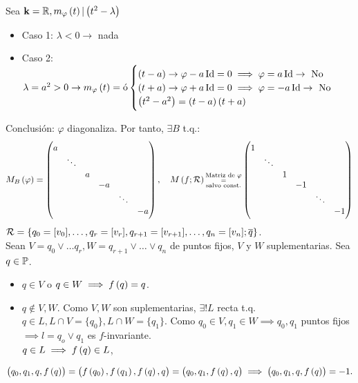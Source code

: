 \begin{obs}
	Sea $\mathbf{k} = \mathbb{R}, m_\varphi\left( t\right) | \left( t^2-\lambda\right)$
	\begin{itemize}
		\item Caso 1: $\lambda<0 \rightarrow$ nada 
		\item Caso 2: $\lambda = a^2>0 \rightarrow m_\varphi\left( t\right) = \text{ó}
		\begin{cases}
			\left( t-a\right) \rightarrow \varphi -a\operatorname{Id}=0\implies\varphi=a\operatorname{Id} \rightarrow \text{ No} \\
			\left( t+a\right) \rightarrow \varphi +a\operatorname{Id}=0\implies\varphi=-a\operatorname{Id} \rightarrow \text{ No} \\
			\left( t^2-a^2\right) = \left( t-a\right)\left( t+a\right)
		\end{cases}$
	\end{itemize}
	Conclusión: $\varphi$ diagonaliza.
	Por tanto, $\exists B$ t.q.:
	\begin{gather*}
		M_B\left(\varphi\right) =
		\begin{pmatrix}
			a & & & & & \\
			& \ddots & & & & \\
			& & a & & & \\
			& & & -a & & \\
			& & & & \ddots & \\
			& & & & & -a
		\end{pmatrix}, \quad
		M\left( f;\mathcal{R}\right) \substack{\text{Matriz de } \varphi \\=\\ \text{salvo const.}} \begin{pmatrix}
			1 & & & & & \\
			& \ddots & & & & \\
			& & 1 & & & \\
			& & & -1 & & \\
			& & & & \ddots & \\
			& & & & & -1\\
		\end{pmatrix}
	\end{gather*}
	$\mathcal{R} = \{q_0 = [v_0], \dots, q_r=[v_r], q_{r+1} = [v_{r+1}], \dots, q_n = [v_n]; \overline{q}\}$.\\
	Sean $V = q_0 \vee \dots q_r, W = q_{r+1} \vee \dots \vee q_n$ de puntos fijos, $V$ y $W$ suplementarias.
	Sea $q \in \mathbb{P}$.
	\begin{itemize}
		\item $q \in V$ o $q \in W \implies f\left( q\right)=q$.
		\item $q \notin V, W$. Como $V,W$ son suplementarias, $\exists! L$ recta t.q. $q\in L, L\cap V=\{q_0\}, L\cap W = \{q_1\}$. Como $q_0\in V, q_1 \in W \implies q_0, q_1$ puntos fijos $\implies l = q_o \vee q_1$ es $f$-invariante. \\
		$q \in L \implies f\left( q\right) \in L$,
	\end{itemize}
	\[\left( q_0, q_1, q, f\left( q\right)\right) = \left( f\left( q_0\right), f\left( q_1\right), f\left( q\right), q\right) = \left( q_0, q_1, f\left( q\right), q\right) \implies \left( q_0, q_1, q, f\left( q\right)\right) = -1.\] %
\end{obs}
